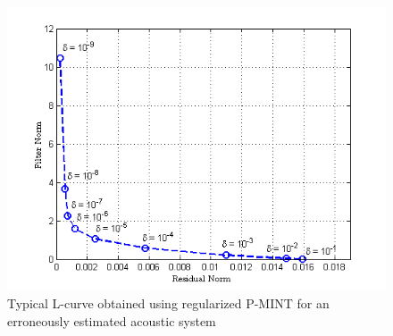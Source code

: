 \documentclass[draftcls,onecolumn,11pt]{IEEEtran}
\begin{document}
\begin{figure}[h]
\centering
\includegraphics[scale = 0.65]{Plots/lcurve_ex}
\caption{Typical L-curve obtained using regularized P-MINT for an erroneously estimated acoustic system}
\label{fig: lcurveex}
\end{figure}
\end{document}
